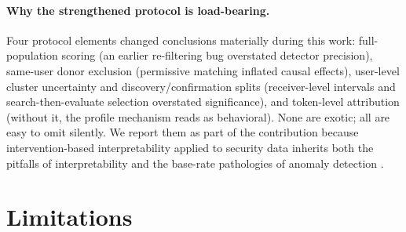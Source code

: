 \documentclass[10pt]{article} %
\begin{document}
\paragraph{Why the strengthened protocol is load-bearing.}
Four protocol elements changed conclusions materially during this work:
full-population scoring (an earlier re-filtering bug overstated detector
precision), same-user donor exclusion (permissive matching inflated causal
effects), user-level cluster uncertainty and discovery/confirmation splits
(receiver-level intervals and search-then-evaluate selection overstated
significance), and token-level attribution (without it, the profile mechanism
reads as behavioral). None are exotic; all are easy to omit silently. We
report them as part of the contribution because intervention-based
interpretability applied to security data inherits both the pitfalls of
interpretability \citep{heimersheim2024use} and the base-rate pathologies of
anomaly detection \citep{chandola2009anomaly}.

\section{Limitations}
\label{sec:limitations}
\end{document}
